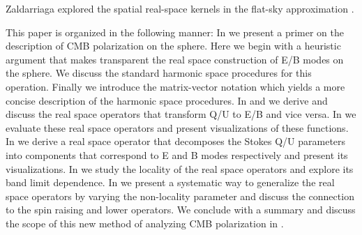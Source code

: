 Zaldarriaga explored the spatial real-space kernels in the flat-sky approximation \citep{Zaldarriaga2001a}.

This paper is organized in the following manner: In  we present a primer on the description of CMB polarization on the sphere. Here we begin with a heuristic argument that makes transparent the real space construction of E/B modes on the sphere. We discuss the standard harmonic space procedures for this operation. Finally we introduce the matrix-vector notation which yields a more concise description of the harmonic space procedures. In  and  we derive and discuss the real space operators that transform Q/U to E/B and vice versa. In  we evaluate these real space operators and present visualizations of these functions. In  we derive a real space operator that decomposes the Stokes Q/U  parameters into components that correspond to E and B modes respectively and present its visualizations.  In  we study the locality of the real space operators and explore its band limit dependence. In  we present a systematic way to generalize the real space operators by varying the non-locality parameter and discuss the connection to the spin raising and lower operators. We conclude with a summary and discuss the scope of this new method of analyzing CMB polarization in .
